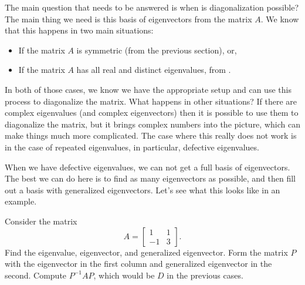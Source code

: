 \documentclass{ximera}
\begin{document}
The main question that needs to be answered is when is diagonalization possible? The main thing we need is this basis of eigenvectors from the matrix $A$. We know that this happens in two main situations:
\begin{itemize}
    \item If the matrix $A$ is symmetric (from the previous section), or,
    \item If the matrix $A$ has all real and distinct eigenvalues, from .
\end{itemize}

In both of those cases, we know we have the appropriate setup and can use this process to diagonalize the matrix. What happens in other situations? If there are complex eigenvalues (and complex eigenvectors) then it is possible to use them to diagonalize the matrix, but it brings complex numbers into the picture, which can make things much more complicated. The case where this really does not work is in the case of repeated eigenvalues, in particular, defective eigenvalues. 

When we have defective eigenvalues, we can not get a full basis of eigenvectors. The best we can do here is to find as many eigenvectors as possible, and then fill out a basis with generalized eigenvectors. Let's see what this looks like in an example.

\begin{example}
    Consider the matrix 
    \[ 
        A = 
        \begin{bmatrix} 
            1 & 1 \\ 
            -1 & 3 
        \end{bmatrix}. 
    \] 
    Find the eigenvalue, eigenvector, and generalized eigenvector. Form the matrix $P$ with the eigenvector in the first column and generalized eigenvector in the second. Compute $P^{-1}AP$, which would be $D$ in the previous cases.
\end{example}
\end{document}
